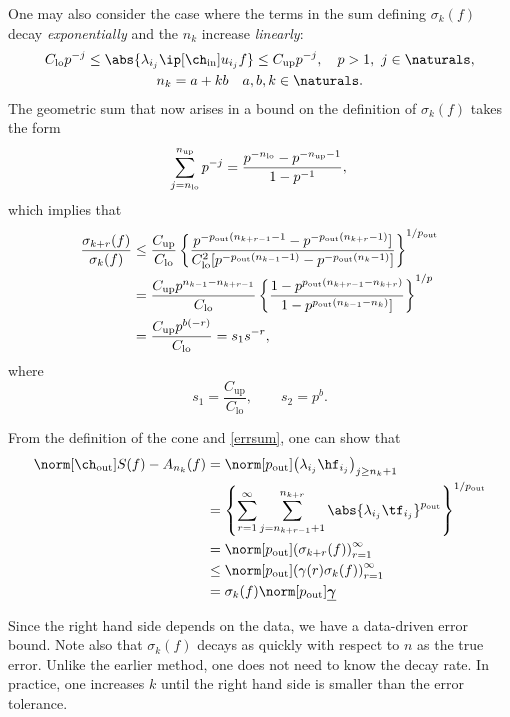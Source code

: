 \documentclass[final]{elsarticle}
\newcommand{\chin}{\ch_{\text{\rm{in}}}}
\newcommand{\chout}{\ch_{\text{\rm{out}}}}
\newcommand{\pout}{p_{\text{\rm{out}}}}
\newcommand{\bgamma}{\underline{\boldsymbol\gamma}}
\theoremstyle{definition}
\theoremstyle{remark}
\DeclareMathOperator{\up}{up}
\DeclareMathOperator{\lo}{lo}
\begin{document}
One may also consider the case where the terms in the sum defining $\sigma_k(f)$ decay \emph{exponentially} and the $n_k$ increase \emph{linearly}:
\begin{gather*}
C_{\lo} p^{-j} \le \abs{\lambda_{i_j} \ip[\chin]{u_{i_j}}{f}} \le C_{\up} p^{-j}, \quad  p>1, \ j \in \naturals, \\
n_k = a +kb  \quad a, b, k \in \naturals.
\end{gather*}
The geometric sum that now arises in a bound on the  definition of $\sigma_k(f)$ takes the form
\begin{equation*}
\sum_{j=n_{\lo}}^{n_{\up}} p^{-j} = \frac{p^{-n_{\lo}} - p^{-n_{\up}-1}}{1-p^{-1}}, \\
\end{equation*}
which implies that
\begin{align*}
\frac{\sigma_{k+r}(f)}{\sigma_k(f)} & \le
\frac{C_{\up}}  {C_{\lo}} \left\{\frac{p^{-\pout( n_{k+r-1}-1} - p^{- \pout(n_{k+r}-1)}]}  {C_{\lo}^2[p^{-\pout(n_{k-1}-1)} - p^{-\pout(n_{k}-1)}]}\right\}^{1/\pout} \\
& =
\frac{C_{\up} p^{n_{k-1}-n_{k+r-1}}} {C_{\lo}}  \left\{\frac{1 - p^{\pout(n_{k+r-1}-n_{k+r})}} {1 - p^{\pout(n_{k-1}-n_{k})}]} \right\}^{1/p}\\
& = \frac{ C_{\up} p^{b(-r)}}  {C_{\lo}}  = s_1 s^{-r},
\end{align*}
where
\[
s_1 = \frac{ C_{\up}}  {C_{\lo}} , \qquad s_2 = p^b.
\]

From the definition of the cone and \eqref{errsum}, one can show that
\begin{equation}\label{algoineq}
\begin{aligned}
\norm[\chout]{S(f)-A_{n_k}(f)} &= \norm[\pout]{\left(\lambda_{i_j} \hf_{i_j} \right)_{j\ge n_k+1}} \\
&= \left\{\sum_{r=1}^\infty \sum_{j=n_{k+r-1}+1}^{n_{k+r}}  \abs{\lambda_{i_j}\tf_{i_j} }^{\pout}  \right\}^{1/\pout}\\
&= \norm[\pout]{ \left(\sigma_{k+r}(f)\right)_{r=1}^{\infty}} \\
&\le \norm[\pout]{ \left(\gamma(r)\sigma_{k}(f)\right)_{r=1}^{\infty}} \\
&= \sigma_{k}(f)\norm[\pout]{\bgamma}
\end{aligned}
\end{equation}

Since the right hand side depends on the data, we have a data-driven error bound.  Note also that $\sigma_k(f)$ decays as quickly with respect to $n$ as the true error.  Unlike the earlier method, one does not need to know the decay rate.  In practice, one increases $k$ until the right hand side is smaller than the error tolerance.
\end{document}
